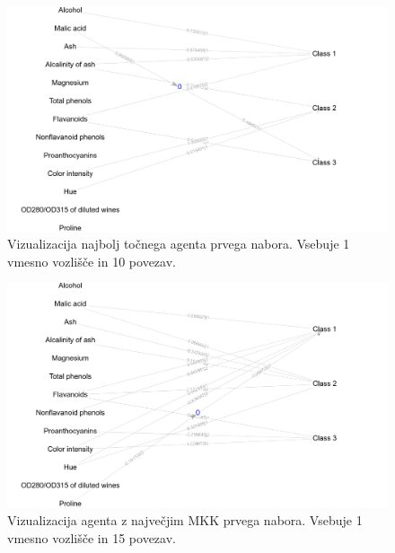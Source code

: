 \begin{figure}[H]
    \begin{center}
        \includegraphics[width=13cm]{wine/1/acc_g}
    \end{center}
    \caption{Vizualizacija najbolj točnega agenta prvega nabora. Vsebuje 1 vmesno vozlišče in 10 povezav.}
    \label{fig:wine_acc_1_g}
\end{figure}

\begin{figure}[H]
    \begin{center}
        \includegraphics[width=13cm]{wine/1/mcc_g}
    \end{center}
    \caption{Vizualizacija agenta z največjim MKK prvega nabora. Vsebuje 1 vmesno vozlišče in 15 povezav.}
    \label{fig:wine_mcc_1_g}
\end{figure}

